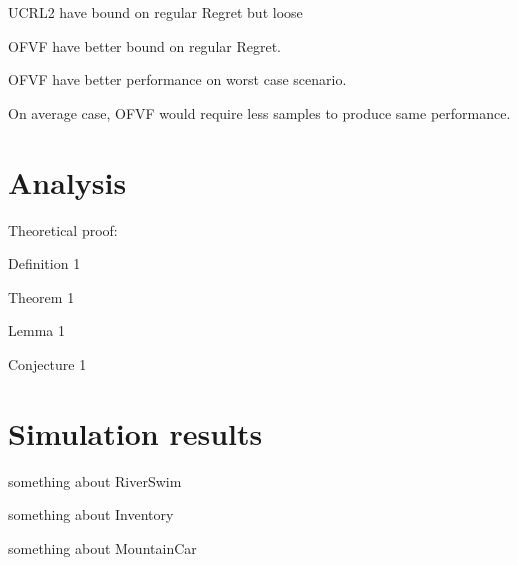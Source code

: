 \documentclass{article}
\begin{document}
UCRL2 have bound on regular Regret but loose

OFVF have better bound on regular Regret.

OFVF have better performance on worst case scenario.

On average case, OFVF would require less samples to produce same
performance.


\section{Analysis}

Theoretical proof:

Definition 1

Theorem 1

Lemma 1

Conjecture 1

\section{Simulation results}

something about RiverSwim

something about Inventory

something about MountainCar
\end{document}
